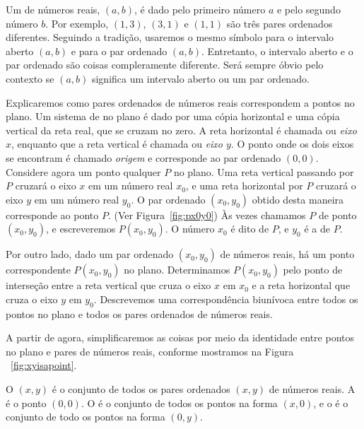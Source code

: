 Um  de números reais, $( a,b )$, é dado
pelo primeiro número $a$ e pelo segundo número $b$. Por exemplo, $( 1,3 )$, $( 3,1 )$ e $( 1,1 )$ são três pares ordenados
diferentes. Seguindo a tradição, usaremos o mesmo símbolo para o intervalo
aberto $(a,b)$ e para o par ordenado $(a, b)$. Entretanto, o intervalo
aberto e o par ordenado são coisas compleramente diferente. Será sempre
óbvio pelo contexto se $(a,b)$ significa um intervalo aberto ou
um par ordenado.

Explicaremos como pares ordenados de números reais correspondem a
pontos no plano. Um sistema de  no
plano é dado por uma cópia horizontal e uma cópia vertical da reta
real, que se cruzam no zero. A reta horizontal é chamada  ou \emph{eixo $x$}, enquanto que a reta vertical é chamada
 ou \emph{eixo $y$}. O ponto onde os dois
eixos se encontram é chamado \emph{origem} e corresponde ao par
ordenado $(0,0)$. Considere agora um ponto qualquer $P$ no plano. Uma
reta vertical passando por $P$ cruzará o eixo $x$ em um número real
$x_0$, e uma reta horizontal por $P$ cruzará o eixo $y$ em um número
real $y_0$. O par ordenado $(x_0,y_0)$  obtido desta maneira corresponde
ao ponto $P$. (Ver Figura~\ref{fig:px0y0}) Às vezes chamamos $P$ de ponto
$(x_0,y_0)$, e escreveremos $P(x_0,y_0)$. O número $x_0$ é dito
 de $P$, e $y_0$ é a  de $P$.

Por outro lado, dado um par ordenado $(x_0,y_0)$ de números reais, há um
ponto correspondente $P(x_0,y_0)$ no plano. Determinamos $P(x_0,y_0)$ pelo
ponto de interseção entre a reta vertical que cruza o eixo $x$ em $x_0$
e a reta horizontal que cruza o eixo $y$ em $y_0$. Descrevemos uma
correspondência biunívoca entre todos os pontos no plano e todos os
pares ordenados de números reais.

A partir de agora, simplificaremos as coisas por meio da identidade entre
pontos no plano e pares de números reais, conforme mostramos na Figura%
~\ref{fig:xyisapoint}.


\begin{defin}
O  $(x,y)$ é o conjunto de todos os pares ordenados $(x,y)$
de números reais. A  é o ponto $(0,0)$. O 
é o conjunto de todos os pontos na forma $(x,0)$, e o  é
o conjunto de todo os pontos na forma $(0,y)$. 
\end{defin}

